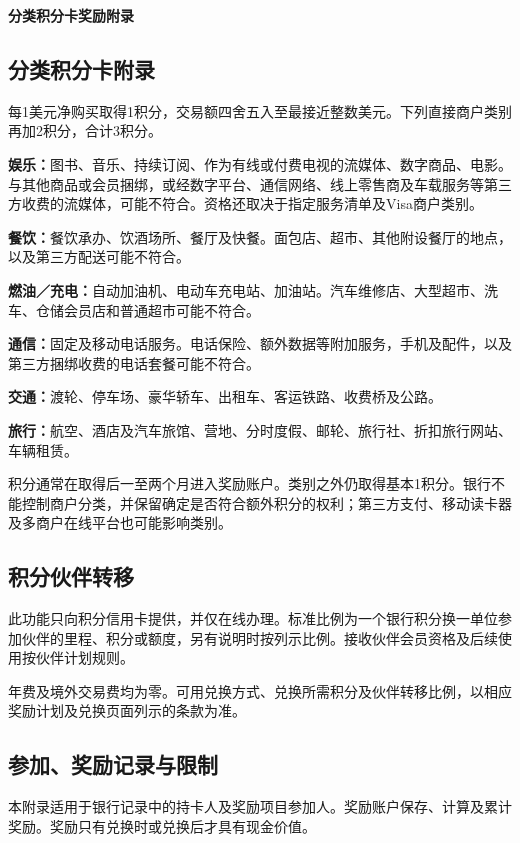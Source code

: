 \documentclass[UTF8,fontset=none,11pt,a4paper]{ctexart}
\begin{document}
{\noindent\fontsize{20}{25}\selectfont\bfseries 分类积分卡奖励附录\par}
\vspace{10pt}
\subsection*{分类积分卡附录}
每1美元净购买取得1积分，交易额四舍五入至最接近整数美元。下列直接商户类别再加2积分，合计3积分。


\textbf{娱乐：}图书、音乐、持续订阅、作为有线或付费电视的流媒体、数字商品、电影。与其他商品或会员捆绑，或经数字平台、通信网络、线上零售商及车载服务等第三方收费的流媒体，可能不符合。资格还取决于指定服务清单及Visa商户类别。


\textbf{餐饮：}餐饮承办、饮酒场所、餐厅及快餐。面包店、超市、其他附设餐厅的地点，以及第三方配送可能不符合。


\textbf{燃油／充电：}自动加油机、电动车充电站、加油站。汽车维修店、大型超市、洗车、仓储会员店和普通超市可能不符合。


\textbf{通信：}固定及移动电话服务。电话保险、额外数据等附加服务，手机及配件，以及第三方捆绑收费的电话套餐可能不符合。


\textbf{交通：}渡轮、停车场、豪华轿车、出租车、客运铁路、收费桥及公路。


\textbf{旅行：}航空、酒店及汽车旅馆、营地、分时度假、邮轮、旅行社、折扣旅行网站、车辆租赁。


积分通常在取得后一至两个月进入奖励账户。类别之外仍取得基本1积分。银行不能控制商户分类，并保留确定是否符合额外积分的权利；第三方支付、移动读卡器及多商户在线平台也可能影响类别。


\subsection*{积分伙伴转移}
此功能只向积分信用卡提供，并仅在线办理。标准比例为一个银行积分换一单位参加伙伴的里程、积分或额度，另有说明时按列示比例。接收伙伴会员资格及后续使用按伙伴计划规则。


年费及境外交易费均为零。可用兑换方式、兑换所需积分及伙伴转移比例，以相应奖励计划及兑换页面列示的条款为准。


\subsection*{参加、奖励记录与限制}
本附录适用于银行记录中的持卡人及奖励项目参加人。奖励账户保存、计算及累计奖励。奖励只有兑换时或兑换后才具有现金价值。
\end{document}
